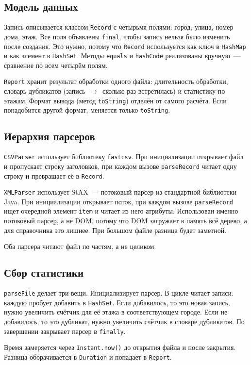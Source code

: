 \documentclass[12pt]{extarticle}
\newcommand{\cmd}[1]{\texttt{#1}}
\begin{document}
\subsection{Модель данных}

Запись описывается классом \cmd{Record} с четырьмя полями:
город, улица, номер дома, этаж. Все поля объявлены \cmd{final},
чтобы запись нельзя было изменить после создания. Это нужно,
потому что \cmd{Record} используется как ключ в \cmd{HashMap}
и как элемент в \cmd{HashSet}. Методы \cmd{equals} и
\cmd{hashCode} реализованы вручную~--- сравнение по всем четырём
полям.

\cmd{Report} хранит результат обработки одного файла: длительность
обработки, словарь дубликатов (запись~$\to$~сколько раз
встретилась) и статистику по этажам. Формат вывода (метод
\cmd{toString}) отделён от самого расчёта. Если понадобится
другой формат, меняется только \cmd{toString}.

\subsection{Иерархия парсеров}

\cmd{CSVParser} использует библиотеку \cmd{fastcsv}. При
инициализации открывает файл и пропускает строку заголовков, при
каждом вызове \cmd{parseRecord} читает одну строку и превращает
её в \cmd{Record}.

\cmd{XMLParser} использует StAX~--- потоковый парсер из
стандартной библиотеки Java. При инициализации открывает поток,
при каждом вызове \cmd{parseRecord} ищет очередной элемент
\cmd{item} и читает из него атрибуты. Использован именно
потоковый парсер, а не DOM, потому что DOM загружает в память
всё дерево, а для справочника это лишнее. При большом файле
разница будет заметной.

Оба парсера читают файл по частям, а не целиком.

\subsection{Сбор статистики}

\cmd{parseFile} делает три вещи. Инициализирует парсер. В цикле
читает записи: каждую пробует добавить в \cmd{HashSet}. Если
добавилось, то это новая запись, нужно увеличить счётчик для её
этажа в соответствующем городе. Если не добавилось, то это
дубликат, нужно увеличить счётчик в словаре дубликатов. По
завершении закрывает парсер в \cmd{finally}.

Время замеряется через \cmd{Instant.now()} до открытия файла и
после закрытия. Разница оборачивается в \cmd{Duration} и попадает
в \cmd{Report}.
\end{document}
